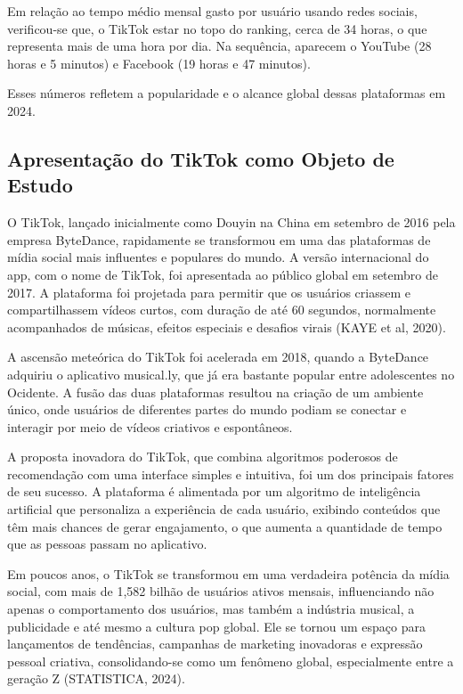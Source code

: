 Em relação ao tempo médio mensal gasto por usuário usando redes sociais, verificou-se que, o TikTok estar no topo do ranking, cerca de 34 horas, o que representa mais de uma hora por dia. Na sequência, aparecem o YouTube (28 horas e 5 minutos) e Facebook (19 horas e 47 minutos).  \vskip0.3cm


Esses números refletem a popularidade e o alcance global dessas plataformas em 2024.





\subsection{Apresentação do TikTok como Objeto de Estudo}

O TikTok, lançado inicialmente como Douyin na China em setembro de 2016 pela empresa ByteDance, rapidamente se transformou em uma das plataformas de mídia social mais influentes e populares do mundo. A versão internacional do app, com o nome de TikTok, foi apresentada ao público global em setembro de 2017. A plataforma foi projetada para permitir que os usuários criassem e compartilhassem vídeos curtos, com duração de até 60 segundos, normalmente acompanhados de músicas, efeitos especiais e desafios virais 
 (KAYE et al, 2020).\vskip0.3cm

A ascensão meteórica do TikTok foi acelerada em 2018, quando a ByteDance adquiriu o aplicativo musical.ly, que já era bastante popular entre adolescentes no Ocidente. A fusão das duas plataformas resultou na criação de um ambiente único, onde usuários de diferentes partes do mundo podiam se conectar e interagir por meio de vídeos criativos e espontâneos.\vskip0.3cm

A proposta inovadora do TikTok, que combina algoritmos poderosos de recomendação com uma interface simples e intuitiva, foi um dos principais fatores de seu sucesso. A plataforma é alimentada por um algoritmo de inteligência artificial que personaliza a experiência de cada usuário, exibindo conteúdos que têm mais chances de gerar engajamento, o que aumenta a quantidade de tempo que as pessoas passam no aplicativo.\vskip0.3cm

Em poucos anos, o TikTok se transformou em uma verdadeira potência da mídia social, com mais de 1,582 bilhão de usuários ativos mensais, influenciando não apenas o comportamento dos usuários, mas também a indústria musical, a publicidade e até mesmo a cultura pop global. Ele se tornou um espaço para lançamentos de tendências, campanhas de marketing inovadoras e expressão pessoal criativa, consolidando-se como um fenômeno global, especialmente entre a geração Z (STATISTICA, 2024).\vskip0.3cm

